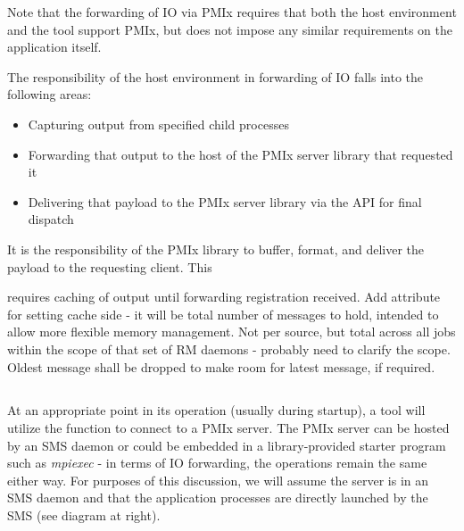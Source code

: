 Note that the forwarding of \ac{IO} via \ac{PMIx} requires that both the host environment and the tool support \ac{PMIx}, but does not impose any similar requirements on the application itself.

\advicermstart
The responsibility of the host environment in forwarding of \ac{IO} falls into the following areas:

\begin{itemize}
    \item Capturing output from specified child processes
    \item Forwarding that output to the host of the \ac{PMIx} server library that requested it
    \item Delivering that payload to the \ac{PMIx} server library via the  \ac{API} for final dispatch
\end{itemize}

\advicermend

\adviceimplstart
It is the responsibility of the \ac{PMIx} library to buffer, format, and deliver the payload to the requesting client. This

requires caching of output until forwarding registration received. Add attribute for setting cache side - it will be total number of messages to hold, intended to allow more flexible memory management. Not per source, but total across all jobs within the scope of that set of RM daemons - probably need to clarify the scope. Oldest message shall be dropped to make room for latest message, if required.

\adviceimplend

\subsection{}

At an appropriate point in its operation (usually during startup), a tool will utilize the  function to connect to a \ac{PMIx} server. The \ac{PMIx} server can be hosted by an \ac{SMS} daemon or could be embedded in a library-provided starter program such as \textit{mpiexec} - in terms of \ac{IO} forwarding, the operations remain the same either way. For purposes of this discussion, we will assume the server is in an \ac{SMS} daemon and that the application processes are directly launched by the \ac{SMS} (see diagram at right).

